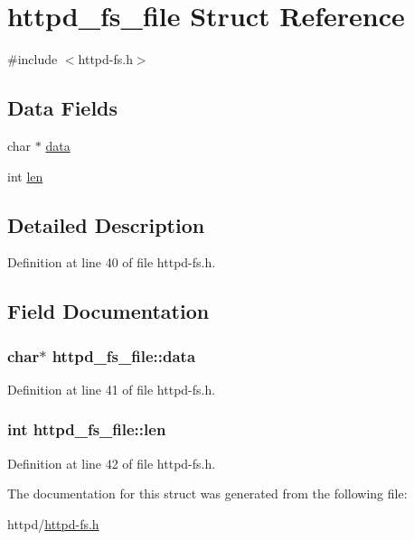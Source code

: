 \hypertarget{structhttpd__fs__file}{
\section{httpd\_\-fs\_\-file Struct Reference}
\label{structhttpd__fs__file}
}


{\ttfamily \#include $<$httpd-\/fs.h$>$}

\subsection*{Data Fields}
\begin{DoxyCompactItemize}
\item 
char $\ast$ \hyperlink{structhttpd__fs__file_ae2e47b38ba2983bec372c0e61c999ff6}{data}
\item 
int \hyperlink{structhttpd__fs__file_a0869f16f462d484884f4f4faab6b0008}{len}
\end{DoxyCompactItemize}


\subsection{Detailed Description}


Definition at line 40 of file httpd-\/fs.h.



\subsection{Field Documentation}
\hypertarget{structhttpd__fs__file_ae2e47b38ba2983bec372c0e61c999ff6}{
\subsubsection[{data}]{\setlength{\rightskip}{0pt plus 5cm}char$\ast$ {\bf httpd\_\-fs\_\-file::data}}}
\label{structhttpd__fs__file_ae2e47b38ba2983bec372c0e61c999ff6}


Definition at line 41 of file httpd-\/fs.h.

\hypertarget{structhttpd__fs__file_a0869f16f462d484884f4f4faab6b0008}{
\subsubsection[{len}]{\setlength{\rightskip}{0pt plus 5cm}int {\bf httpd\_\-fs\_\-file::len}}}
\label{structhttpd__fs__file_a0869f16f462d484884f4f4faab6b0008}


Definition at line 42 of file httpd-\/fs.h.



The documentation for this struct was generated from the following file:\begin{DoxyCompactItemize}
\item 
httpd/\hyperlink{httpd-fs_8h}{httpd-\/fs.h}\end{DoxyCompactItemize}
